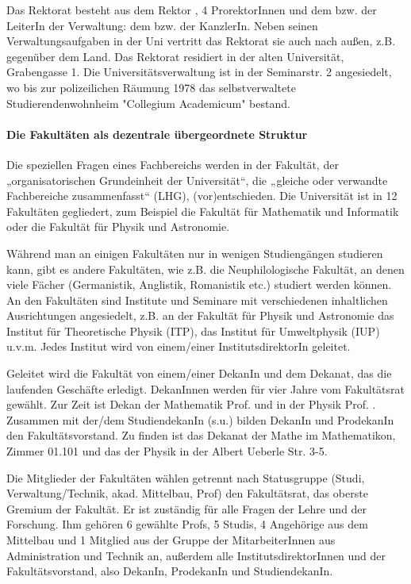 Das Rektorat besteht aus dem Rektor \rektor, 4 ProrektorInnen und dem bzw. der LeiterIn der Verwaltung: dem bzw. der KanzlerIn. Neben seinen Verwaltungsaufgaben in der Uni vertritt das Rektorat sie auch nach außen, z.B. gegenüber dem Land. Das Rektorat residiert in der alten Universität, Grabengasse 1.
Die Universitätsverwaltung ist in der Seminarstr. 2 angesiedelt, wo bis zur polizeilichen Räumung 1978 das selbstverwaltete Studierendenwohnheim "Collegium Academicum" bestand.


\paragraph{Die Fakultäten als dezentrale übergeordnete Struktur}

Die speziellen Fragen eines Fachbereichs werden in der Fakultät, der
„organisatorischen Grundeinheit der Universität“, die „gleiche oder
verwandte Fachbereiche zusammenfasst“ (LHG), (vor)entschieden. Die
Universität ist in 12 Fakultäten gegliedert, zum Beispiel die Fakultät für
Mathematik und Informatik oder die Fakultät für Physik und Astronomie.

Während man an einigen Fakultäten nur in wenigen Studiengängen studieren
kann, gibt es andere Fakultäten, wie z.B. die Neuphilologische Fakultät,
an denen viele Fächer (Germanistik, Anglistik, Romanistik etc.) studiert
werden können. An den Fakultäten sind Institute und Seminare mit verschiedenen inhaltlichen Ausrichtungen angesiedelt, z.B. an der Fakultät für Physik und Astronomie das Institut für Theoretische Physik (ITP), das Institut für Umweltphysik (IUP) u.v.m. Jedes Institut wird von einem/einer InstitutsdirektorIn geleitet.

Geleitet wird die Fakultät von einem/einer DekanIn und dem Dekanat, das die laufenden Geschäfte erledigt. DekanInnen werden für vier Jahre vom Fakultätsrat gewählt. Zur Zeit ist Dekan der Mathematik Prof. \dekanmathe{} und in der Physik Prof. \dekanphysik. Zusammen mit der/dem
StudiendekanIn (s.u.) bilden DekanIn und ProdekanIn den Fakultätsvorstand. Zu finden ist das Dekanat der Mathe im \Gls{Mathematikon}, Zimmer 01.101 und das der Physik in der Albert Ueberle Str. 3-5.

Die Mitglieder der Fakultäten wählen getrennt nach Statusgruppe (Studi, Verwaltung/Technik, akad. Mittelbau, Prof) den Fakultätsrat, das oberste Gremium der Fakultät. Er ist zuständig für alle Fragen der Lehre und der Forschung. Ihm gehören 6 gewählte Profs, 5 Studis, 4 Angehörige aus dem Mittelbau und 1 Mitglied aus der Gruppe der MitarbeiterInnen aus Administration und Technik an, außerdem alle InstitutsdirektorInnen und der Fakultätsvorstand, also DekanIn, ProdekanIn und StudiendekanIn.

